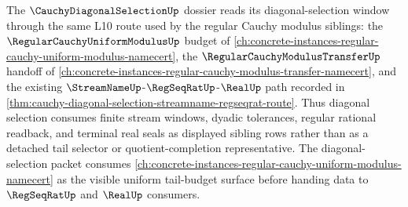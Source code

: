 The $\CauchyDiagonalSelectionUp$ dossier reads its diagonal-selection window through the same L10 route used by the regular Cauchy modulus siblings: the $\RegularCauchyUniformModulusUp$ budget of \autoref{ch:concrete-instances-regular-cauchy-uniform-modulus-namecert}, the $\RegularCauchyModulusTransferUp$ handoff of \autoref{ch:concrete-instances-regular-cauchy-modulus-transfer-namecert}, and the existing $\StreamNameUp$-$\RegSeqRatUp$-$\RealUp$ path recorded in \autoref{thm:cauchy-diagonal-selection-streamname-regseqrat-route}. Thus diagonal selection consumes finite stream windows, dyadic tolerances, regular rational readback, and terminal real seals as displayed sibling rows rather than as a detached tail selector or quotient-completion representative. The diagonal-selection packet consumes \autoref{ch:concrete-instances-regular-cauchy-uniform-modulus-namecert} as the visible uniform tail-budget surface before handing data to $\RegSeqRatUp$ and $\RealUp$ consumers.
